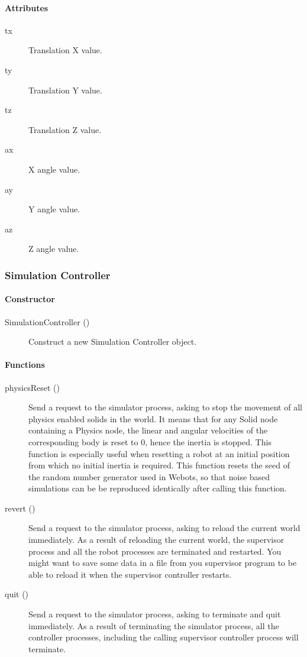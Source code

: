 \paragraph{Attributes}

\noindent
\begin{description}
\item[tx] Translation X value.
\item[ty] Translation Y value.
\item[tz] Translation Z value.
\item[ax] X angle value.
\item[ay] Y angle value.
\item[az] Z angle value.
\end{description}

\subsubsection{Simulation Controller}

\paragraph{Constructor}

\noindent
\begin{description}
\item[{SimulationController ()}] Construct a new Simulation Controller
  object.
\end{description}

\paragraph{Functions}

\noindent
\begin{description}
\item[physicsReset ()] Send a request to the simulator process,
  asking to stop the movement of all physics enabled solids in the
  world. It means that for any Solid node containing a Physics node,
  the linear and angular velocities of the corresponding body is reset
  to 0, hence the inertia is stopped. This function is especially
  useful when resetting a robot at an initial position from which no
  initial inertia is required.  This function resets the seed of the
  random number generator used in Webots, so that noise based
  simulations can be be reproduced identically after calling this
  function.

\item[revert ()] Send a request to the simulator process, asking to
  reload the current world immediately. As a result of reloading the
  current world, the supervisor process and all the robot processes
  are terminated and restarted. You might want to save some data in a
  file from you supervisor program to be able to reload it when the
  supervisor controller restarts.

\item[quit ()] Send a request to the simulator process, asking to
  terminate and quit immediately. As a result of terminating the
  simulator process, all the controller processes, including the
  calling supervisor controller process will terminate.
\end{description}

